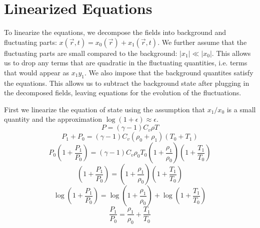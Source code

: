 \documentclass[apj,onecolumn]{emulateapj}
\begin{document}
\section{Linearized Equations}
\label{sec:linear}
To linearize the equations, we decompose the fields into background and 
fluctuating parts: $x(\vec{r},t) = x_0(\vec{r}) + x_1(\vec{r},t)$. We further 
assume that the fluctuating parts are small compared to the background:
$|x_1| \ll |x_0|$. This allows us to drop any terms that are quadratic in 
the fluctuating quantities, i.e. terms that would appear as $x_1 y_1$. We also 
impose that the background quantites satisfy the equations. This allows us 
to subtract the background state after plugging in the decomposed fields, 
leaving equations for the evolution of the fluctuations.

First we linearize the equation of state using the assumption that $x_1/x_0$ 
is a small quantity and the approximation $\log(1+\epsilon) \approx \epsilon$.
\begin{equation}
P = (\gamma -1)C_v\rho T
\end{equation}
\begin{equation}
P_1+P_0 = (\gamma -1)C_v\left(\rho_0+\rho_1\right)\left(T_0+T_1\right)
\end{equation}
\begin{equation}
P_0\left(1+\frac{P_1}{P_0}\right) = (\gamma -1)C_v\rho_0 T_0
          \left(1+\frac{\rho_1}{\rho_0}\right)
          \left(1+\frac{T_1}{T_0}\right)
\end{equation}
\begin{equation}
\left(1+\frac{P_1}{P_0}\right) = \left(1+\frac{\rho_1}{\rho_0}\right)
                                 \left(1+\frac{T_1}{T_0}\right)
\end{equation}
\begin{equation}
\log\left(1+\frac{P_1}{P_0}\right) = \log\left(1+\frac{\rho_1}{\rho_0}\right)
                                 + \log\left(1+\frac{T_1}{T_0}\right)
\end{equation}
\begin{equation}
\frac{P_1}{P_0} = \frac{\rho_1}{\rho_0} + \frac{T_1}{T_0}
\end{equation}
\end{document}
